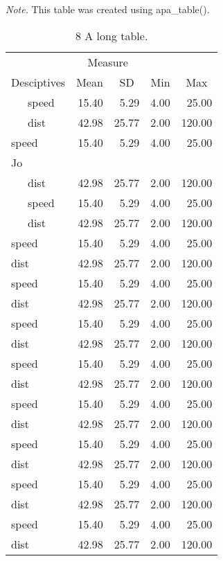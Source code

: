 \documentclass[english,man]{apa6}
\makeatletter
\newcommand\LastLTentrywidth{1em}
\newlength\longtablewidth
\newcommand\getlongtablewidth{%
 \begingroup
  \ifcsname LT@\roman{LT@tables}\endcsname
  \global\longtablewidth=0pt
  \renewcommand\LT@entry[2]{\global\advance\longtablewidth by ##2\relax\gdef\LastLTentrywidth{##2}}%
  \@nameuse{LT@\roman{LT@tables}}%
  \fi
\endgroup}
\makeatother
\begin{document}
\begin{center}
\begin{ThreePartTable}
\begin{TableNotes}[para]
\textit{Note.} This table was created using apa\_table().
\end{TableNotes}
\begin{longtable}{lrrlr}\noalign{\getlongtablewidth\global\LTcapwidth=\longtablewidth}
\caption{\label{tab:unnamed-chunk-7}8 A long table.}\\
\toprule
 & \multicolumn{2}{c}{Measure}  &  &\\
\cmidrule(r){2-3}
Desciptives & \multicolumn{1}{c}{Mean} & \multicolumn{1}{c}{SD} & \multicolumn{1}{c}{Min} & \multicolumn{1}{c}{Max}\\
\midrule
\ \ \ speed & 15.40 & 5.29 & 4.00 & 25.00\\
\ \ \ dist & 42.98 & 25.77 & 2.00 & 120.00\\
speed & 15.40 & 5.29 & 4.00 & 25.00\\
Jo &  &  &  & \\ \midrule
\ \ \ dist & 42.98 & 25.77 & 2.00 & 120.00\\
\ \ \ speed & 15.40 & 5.29 & 4.00 & 25.00\\
\ \ \ dist & 42.98 & 25.77 & 2.00 & 120.00\\
speed & 15.40 & 5.29 & 4.00 & 25.00\\
dist & 42.98 & 25.77 & 2.00 & 120.00\\
speed & 15.40 & 5.29 & 4.00 & 25.00\\
dist & 42.98 & 25.77 & 2.00 & 120.00\\
speed & 15.40 & 5.29 & 4.00 & 25.00\\
dist & 42.98 & 25.77 & 2.00 & 120.00\\
speed & 15.40 & 5.29 & 4.00 & 25.00\\
dist & 42.98 & 25.77 & 2.00 & 120.00\\
speed & 15.40 & 5.29 & 4.00 & 25.00\\
dist & 42.98 & 25.77 & 2.00 & 120.00\\
speed & 15.40 & 5.29 & 4.00 & 25.00\\
dist & 42.98 & 25.77 & 2.00 & 120.00\\
speed & 15.40 & 5.29 & 4.00 & 25.00\\
dist & 42.98 & 25.77 & 2.00 & 120.00\\
speed & 15.40 & 5.29 & 4.00 & 25.00\\
dist & 42.98 & 25.77 & 2.00 & 120.00\\

\end{longtable}
\end{ThreePartTable}
\end{center}
\end{document}
